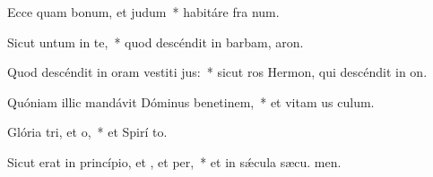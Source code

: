 \item Ecce quam bonum, et  judum~* habitáre fra  num.
\item Sicut untum in te,~* quod descéndit in barbam,  aron.
\item Quod descéndit in oram vestiti jus:~* sicut ros Hermon, qui descéndit in  on.
\item Quóniam illic mandávit Dóminus benetinem,~* et vitam us  culum.
\item Glória tri, et o,~* et Spirí to.
\item Sicut erat in princípio, et , et per,~* et in sǽcula sæcu. men.
